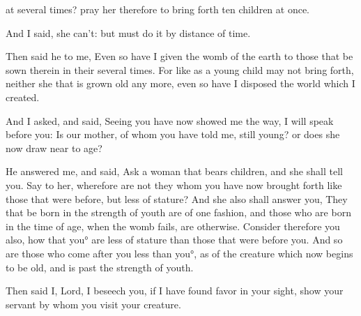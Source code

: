 {{} at several times? pray her therefore to bring forth ten children at once.
\par }{\PP {}And I said, she can’t: but must do it by distance of time.
\par }{\PP {}Then said he to me, Even so have I given the womb of the earth to those that be sown therein in their several times.
For like as a young child may not bring forth, neither she that is grown old
{} any more, even so have I disposed the world which I created.
\par }{\PP {}And I asked, and said, Seeing you have now showed me the way, I will speak before you: Is our mother, of whom you have told me, still young? or does she now draw near to age?
\par }{\PP {}He answered me, and said, Ask a woman that bears children, and she shall tell you.
Say to her, wherefore are not they whom you have now brought forth like those that were before, but less of stature?
And she also shall answer you, They that be born in the strength of youth are of one fashion, and those who are born in the time of age, when the womb fails, are otherwise.
Consider therefore you also, how that you° are less of stature than those that were before you.
And so are those who come after you less than you°, as
{} of the creature which now begins to be old, and is past the strength of youth.
\par }{\PP {}Then said I, Lord, I beseech you, if I have found favor in your sight, show your servant by whom you visit your creature.

}
